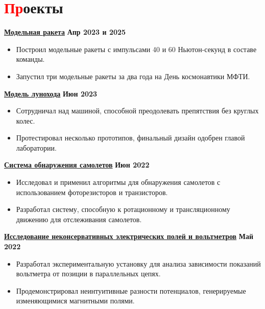 \documentclass[a4paper, 10pt]{article}
\begin{document}
\section{\textcolor{red}{Пр}оекты}
    {\href{https://github.com/icarus-imperium/rocket-2025}{\textbf{Модельная ракета}}} \hfill \textbf{Апр 2023 и 2025}
    \begin{itemize}
        \vspace{-6pt}
    \item Построил модельные ракеты с импульсами 40 и 60 Ньютон-секунд в составе команды.
        \vspace{-6pt}
    \item Запустил три модельные ракеты за два года на День космонавтики МФТИ.
    \end{itemize}
    \vspace{-6pt}
    {\href{https://github.com/rezaaliasgarirenani/Rover}{\textbf{Модель лунохода}}} \hfill \textbf{Июн 2023}
    \begin{itemize}
        \vspace{-6pt}
    \item Сотрудничал над машиной, способной преодолевать препятствия без круглых колес.
        \vspace{-6pt}
    \item Протестировал несколько прототипов, финальный дизайн одобрен главой лаборатории.
    \end{itemize}
    \vspace{-6pt}
    {\href{https://github.com/rezaaliasgarirenani/Aircraft-Detection-System}{\textbf{Система обнаружения самолетов}}} \hfill \textbf{Июн 2022}
    \begin{itemize}
        \vspace{-6pt}
    \item Исследовал и применил алгоритмы для обнаружения самолетов с использованием фоторезисторов и транзисторов.
        \vspace{-6pt}
    \item Разработал систему, способную к ротационному и трансляционному движению для отслеживания самолетов.
    \end{itemize}
    \vspace{-6pt}
    {\href{https://github.com/rezaaliasgarirenani/Non-Conservative-Electric-Fields-and-Voltmeters}{\textbf{Исследование неконсервативных электрических полей и вольтметров}}} \hfill \textbf{Май 2022}
    \begin{itemize}
        \vspace{-6pt}
    \item Разработал экспериментальную установку для анализа зависимости показаний вольтметра от позиции в параллельных цепях.
        \vspace{-6pt}
    \item Продемонстрировал неинтуитивные разности потенциалов, генерируемые изменяющимися магнитными полями.
    \end{itemize}
    \vspace{-10pt}
\end{document}
